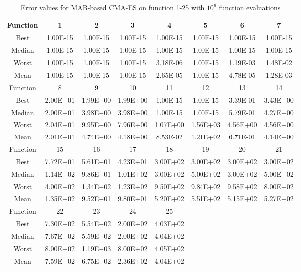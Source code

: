 \begin{table}[h]
\footnotesize
  \centering
\begin{tabular}{@{}cccccccc@{}}
\toprule
Function&1       &2       &3       &4       &5       &6       &7     \\ \midrule
Best    &1.00E-15&1.00E-15&1.00E-15&1.00E-15&1.00E-15&1.00E-15&1.00E-15 \\
Median  &1.00E-15&1.00E-15&1.00E-15&1.00E-15&1.00E-15&1.00E-15&1.00E-15\\
Worst   &1.00E-15&1.00E-15&1.00E-15&3.18E-06&1.00E-15&1.19E-03&1.48E-02\\
Mean    &1.00E-15&1.00E-15&1.00E-15&2.65E-05&1.00E-15&4.78E-05&1.28E-03\\\midrule
Function&8       &9       &10      &11      &12      &13      &14      \\\midrule
Best    &2.00E+01&1.99E+00&1.99E+00&1.00E-15&1.00E-15&3.39E-01&3.43E+00\\
Median  &2.00E+01&3.98E+00&3.98E+00&1.00E-15&1.00E-15&5.79E-01&4.27E+00 \\
Worst   &2.04E+01&9.95E+00&7.96E+00&1.07E+00&1.56E+03&4.56E+00&4.56E+00\\
Mean    &2.01E+01&4.74E+00&4.18E+00&8.53E-02&1.21E+02&6.71E-01&4.14E+00\\\midrule
Function&15      &16      &17      &18      &19      &20      &21\\\midrule
Best    &7.72E+01&5.61E+01&4.23E+01&3.00E+02&3.00E+02&3.00E+02&3.00E+02\\
Median  &1.14E+02&9.86E+01&1.01E+02&3.00E+02&5.00E+02&3.00E+02&5.00E+02\\
Worst   &4.00E+02&1.34E+02&1.23E+02&9.50E+02&9.84E+02&9.58E+02&8.00E+02\\
Mean    &1.35E+02&9.52E+01&9.80E+01&5.20E+02&5.51E+02&5.15E+02&5.27E+02\\\midrule
Function&22      &23      &24      &25&&&\\\midrule
Best    &7.30E+02&5.54E+02&2.00E+02&4.03E+02&&&\\
Median  &7.67E+02&5.59E+02&2.00E+02&4.04E+02&&&\\
Worst   &8.00E+02&1.19E+03&8.00E+02&4.05E+02&&&\\
Mean    &7.59E+02&6.75E+02&2.36E+02&4.04E+02&&&\\\bottomrule
\end{tabular}
\caption{Error values for MAB-based CMA-ES on function 1-25 with $10^6$ function evaluations}
\label{table:errorMABcmaes}
\end{table}

